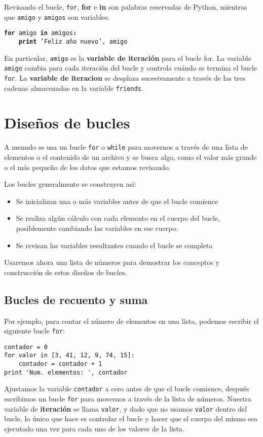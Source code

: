 Revisando el bucle, {\tt for}, {\bf for} e {\bf in} son palabras
reservadas de Python, mientras que {\tt amigo} y {\tt amigos} son variables.

{\tt {\bf for} amigo {\bf in} amigos{\bf :}\\
\verb"    "{\bf print} 'Feliz año nuevo', amigo }

En particular, {\tt amigo} es la {\bf variable de iteración} para
el bucle for. La variable {\tt amigo} cambia para cada iteración del
bucle y controla cuándo se termina el bucle {\tt for}. La
{\bf variable de iteracion} se desplaza sucesivamente a través de
las tres cadenas almacenadas en la variable {\tt friends}.


\section{Diseños de bucles}

A menudo se usa un bucle {\tt for} o {\tt while} para movernos a través de una lista de elementos
o el contenido de un archivo y se busca algo, como el valor
más grande o el más pequeño de los datos que estamos revisando.

Los bucles generalmente se construyen así:

\begin{itemize}

\item Se inicializan una o más variables antes de que el bucle comience

\item Se realiza algún cálculo con cada elemento en el cuerpo del bucle,
posiblemente cambiando las variables en ese cuerpo.

\item Se revisan las variables resultantes cuando el bucle se completa

\end{itemize}

Usaremos ahora una lista de números para demostrar los conceptos y construcción
de estos diseños de bucles.

\subsection{Bucles de recuento y suma}

Por ejemplo, para contar el número de elementos
en una lista, podemos escribir el siguiente bucle {\tt for}:

\beforeverb
\begin{verbatim}
contador = 0
for valor in [3, 41, 12, 9, 74, 15]:
    contador = contador + 1
print 'Num. elementos: ', contador
\end{verbatim}
\afterverb
%
Ajustamos la variable {\tt contador} a cero antes de que el bucle comience,
después escribimos un bucle {\tt for} para movernos a través de la lista de números.
Nuestra variable de {\bf iteración} se llama {\tt valor}, y dado que no
usamos {\tt valor} dentro del bucle, lo único que hace es controlar el bucle
y hacer que el cuerpo del mismo sea ejecutado una vez para cada uno de los
valores de la lista.

